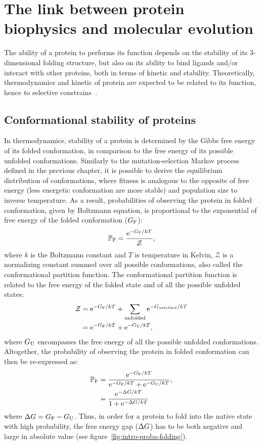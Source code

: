 \section{The link between protein biophysics and molecular evolution}
\label{sec:intro-protein-biophysics}

The ability of a protein to performs its function depends on the stability of its 3-dimensional folding structure, but also on its ability to bind ligands and/or interact with other proteins, both in terms of kinetic and stability.
Theoretically, thermodynamics and kinetic of protein are expected to be related to its function, hence to selective constrains~\citep{Bastolla2017}.

\subsection{Conformational stability of proteins}

In thermodynamics, stability of a protein is determined by the Gibbs free energy of its folded conformation, in comparison to the free energy of its possible unfolded conformations.
Similarly to the mutation-selection Markov process defined in the previous chapter, it is possible to derive the equilibrium distribution of conformations, where fitness is analogous to the opposite of free energy (less energetic conformation are more stable) and population size to inverse temperature.
As a result, probabilities of observing the protein in folded conformation, given by Boltzmann equation, is proportional to the exponential of free energy of the folded conformation ($G_{\textrm{F}}$):
\begin{equation}
\mathbb{P}_{\textrm{F}} = \frac{\mathrm{e}^{-G_{\textrm{F}} / kT}}{\mathcal{Z}},
\end{equation}
where $k$ is the Boltzmann constant and $T$ is temperature in Kelvin, $\mathcal{Z}$ is a normalizing constant summed over all possible conformations, also called the conformational {partition function}.
The conformational partition function is related to the free energy of the folded state and of all the possible unfolded states:
\begin{align}
\mathcal{Z} & = \mathrm{e}^{-G_{\textrm{F}} / kT} + \sum\limits_{\text{unfolded}} \mathrm{e}^{-G_{\text{unfolded}} / kT} \\
            & = \mathrm{e}^{-G_{\textrm{F}} / kT} + \mathrm{e}^{-G_{\textrm{U}} / kT},
\end{align}
where $G_{\textrm{U}}$ encompasses the free energy of all the possible unfolded conformations.
Altogether, the probability of observing the protein in folded conformation can then be re-expressed as:
\begin{align}
\mathbb{P}_{\textrm{F}} & = \frac{\mathrm{e}^{-G_{\textrm{F}} / kT}}{\mathrm{e}^{-G_{\textrm{F}} / kT} + \mathrm{e}^{-G_{\textrm{U}} / kT}}, \\
     & = \frac{\mathrm{e}^{-\Delta G/kT}}{ 1 + \mathrm{e}^{-\Delta G/kT} }
\end{align}
where $\Delta G = G_{\textrm{F}} - G_{\textrm{U}}$.
Thus, in order for a protein to fold into the native state with high probability, the free energy gap ($\Delta G$) has to be both negative and large in absolute value (see figure~\ref{fig:intro-proba-folding}).

